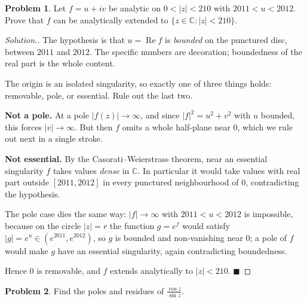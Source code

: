 \documentclass[11pt,a4paper]{article}
\theoremstyle{definition}
\newtheorem{problemx}{Problem}[section]
\newenvironment{problem}{\begin{problemx}}{\end{problemx}}
\newenvironment{solution}
  {\renewcommand{\qedsymbol}{}\begin{proof}[\textit{Solution}.]}
  {\end{proof}}
\begin{document}
\begin{problem}
Let $f = u + iv$ be analytic on $0 < \left|z\right| < 210$ with
$2011 < u < 2012$. Prove that $f$ can be analytically extended to
$\{z \in \mathbb{C} : \left|z\right| < 210\}$.
\end{problem}

\begin{solution}
The hypothesis is that $u = \operatorname{Re}f$ is \emph{bounded} on the punctured
disc, between $2011$ and $2012$. The specific numbers are decoration; boundedness
of the real part is the whole content.

The origin is an isolated singularity, so exactly one of three things holds:
removable, pole, or essential. Rule out the last two.

\textbf{Not a pole.} At a pole $\left|f(z)\right| \rightarrow \infty$, and since
$\left|f\right|^{2} = u^{2}+v^{2}$ with $u$ bounded, this forces
$\left|v\right| \rightarrow \infty$. But then $f$ omits a whole half-plane near
$0$, which we rule out next in a single stroke.

\textbf{Not essential.} By the Casorati--Weierstrass theorem, near an essential
singularity $f$ takes values \emph{dense} in $\mathbb{C}$. In particular it would
take values with real part outside $[2011,2012]$ in every punctured neighbourhood
of $0$, contradicting the hypothesis.

The pole case dies the same way: $\left|f\right| \rightarrow \infty$ with
$2011 < u < 2012$ is impossible, because on the circle $\left|z\right| = r$ the
function $g = e^{f}$ would satisfy
$\left|g\right| = e^{u} \in \left(e^{2011}, e^{2012}\right)$, so $g$ is bounded and
non-vanishing near $0$; a pole of $f$ would make $g$ have an essential singularity,
again contradicting boundedness.

Hence $0$ is removable, and $f$ extends analytically to
$\left|z\right| < 210$. $\blacksquare$
\end{solution}


\begin{problem}
Find the poles and residues of $\frac{\cos z}{\sin z}$.
\end{problem}
\end{document}
